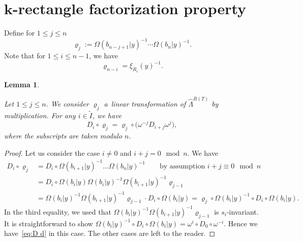 \documentclass[10pt,a4paper]{amsart}
\numberwithin{equation}{section}
\newcommand{\co}{\xi}
\newcommand{\de}{\varrho}
\newtheorem{Lemma}[Theorem]{Lemma}
\theoremstyle{definition}
\begin{document}
\section[k-rectangle factorization property]{$\boldsymbol{k}$-rectangle factorization property}\label{sec:krect}
Define for $1\le j\le n$
\begin{equation}
\label{eq:def de}
\de_j:=
\Omega(b_{n-j+1}|y)^{-1}\cdots \Omega(b_{n}|y)^{-1}.
\end{equation}
Note that for $1\le i\le n-1$, we have
\begin{equation}
\de_{n-i}
=\co_{R_{i}}(y)^{-1}.
\label{eq:d Omega R}
\end{equation}
\begin{Lemma}\label{lem:commutation_relation_Omega}

Let $1\le j\le n$. We consider $\de_j$ a~linear transformation of
$\hat{\Lambda}^{R(T)}$ by multiplication.
For any $i\in \tilde{I}$, we have
\begin{equation}
{D}_i \circ \de_{j}
=\de_j\circ \bigl(\omega^{-j}D_{i+j} \omega^{j}\bigr),
\label{eq:D d}
\end{equation}
where the subscripts are taken modulo $n$.
\end{Lemma}
\begin{proof}
Let us consider the case $i\ne 0$ and $i+j= 0\mod n $.
We have
\begin{align*}
D_i \circ \de_j&=
D_i \circ \Omega(b_{i+1}|y)^{-1}\dots \Omega(b_{n}|y)^{-1}\qquad
\text{by assumption $i+j\equiv 0 \mod n$}\\
&=D_i \circ
\Omega(b_{i}|y)
\Omega(b_{i}|y)^{-1}
\Omega(b_{i+1}|y)^{-1}\de_{j-1}\\
&=\Omega(b_{i}|y)^{-1}
\Omega(b_{i+1}|y)^{-1}\de_{j-1}
\cdot
D_i \circ
\Omega(b_{i}|y)=\de_{j}
\circ
\Omega(b_{i}|y)^{-1}
\circ
D_i \circ
\Omega(b_{i}|y).
\end{align*}
In the third equality, we used that
$\Omega(b_{i}|y)^{-1}
\Omega(b_{i+1}|y)^{-1}\de_{j-1}$
is $s_i$-invariant.
It is straightforward to show
$
\Omega(b_{i}|y)^{-1}
\circ
D_i \circ
\Omega(b_{i}|y)=\omega^i
\circ D_0 \circ \omega^{-i}$.
Hence we have~\eqref{eq:D d} in this case.
The other cases are left to the reader.
\end{proof}
\end{document}
